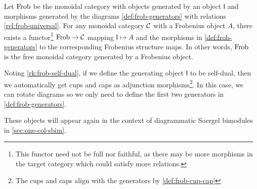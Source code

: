 \begin{remark}
    Let $\operatorname{Frob}$ be the monoidal category with objects generated by an object $\mathsf{I}$ and morphisms generated by the diagrams \eqref{def:frob-generators} with relations \eqref{rel:frob-universal}. For any monoidal category $\mathcal{C}$ with a Frobenius object $A$, there exists a functor\footnote{This functor need not be full nor faithful, as there may be more morphisms in the target category which could satisfy more relations.} $\operatorname{Frob} \to \mathcal{C}$ mapping $\mathsf{I} \mapsto A$ and the morphisms in \eqref{def:frob-generators} to the corresponding Frobenius structure maps. In other words, $\operatorname{Frob}$ is the free monoidal category generated by a Frobenius object.

    Noting \autoref{rk:frob-self-dual}, if we define the generating object $\mathsf{I}$ to be self-dual, then we automatically get cups and caps as adjunction morphisms\footnote{The cups and caps align with the generators by \eqref{def:frob-cup-cap}}. In this case, we can rotate diagrams so we only need to define the first two generators in \eqref{def:frob-generators}.
\end{remark}

These objects will appear again in the context of diagrammatic Soergel bimodules in \autoref{sec:one-col-sbim}.
